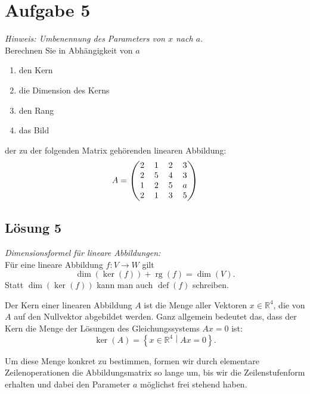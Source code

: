 \documentclass[main.tex]{subfiles}
\begin{document}
\section{Aufgabe 5}
\textit{Hinweis: Umbenennung des Parameters von $x$ nach $a$.}\\
Berechnen Sie in Abhängigkeit von $a$

\begin{enumerate}
    \item den Kern
    \item die Dimension des Kerns
    \item den Rang
    \item das Bild
\end{enumerate}
der zu der folgenden Matrix gehörenden linearen Abbildung:
$$
    \arraycolsep=0.6em
    A = \begin{pmatrix}
        2 & 1 & 2 & 3 \\
        2 & 5 & 4 & 3 \\
        1 & 2 & 5 & a \\
        2 & 1 & 3 & 5
    \end{pmatrix}
$$

\subsection{Lösung 5}
\textit{Dimensionsformel für lineare Abbildungen:}\\
Für eine lineare Abbildung $f: V \to W$ gilt
$$
    \dim (\ker (f)) + \operatorname{rg}(f) = \dim (V).
$$
Statt $\dim (\ker (f))$ kann man auch $\operatorname{def}(f)$ schreiben.


Der Kern einer linearen Abbildung $A$ ist die Menge aller Vektoren $x \in \mathbb{R}^4$, die von $A$ auf den Nullvektor abgebildet werden. Ganz allgemein bedeutet das, dass der Kern die Menge der Lösungen des Gleichungssystems $Ax=0$ ist:
$$
    \ker (A) = \left\{ x\in \mathbb{R}^4 \middle| Ax=0 \right\}.
$$

Um diese Menge konkret zu bestimmen, formen wir durch elementare Zeilenoperationen die Abbildungsmatrix so lange um, bis wir die Zeilenstufenform erhalten und dabei den Parameter $a$ möglichst frei stehend haben. 
\end{document}
